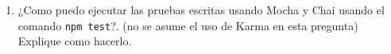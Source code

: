 \begin{Shaded}
\begin{Highlighting}[]
        \NormalTok{[~}\NormalTok{(karma)]$ cat tests/}
         \OtherTok{____}\NormalTok{;}

        \FunctionTok{_____}\NormalTok{(}\NormalTok{, }\NormalTok{() \{}

            \FunctionTok{____}\NormalTok{(}\NormalTok{, }\NormalTok{() \{}
                 \NormalTok{= }\NormalTok{;}
                \NormalTok{();}
                \FunctionTok{_________}\NormalTok{(}\NormalTok{, }\NormalTok{);}
            \NormalTok{\});}
        \NormalTok{\});}
\end{Highlighting}
\end{Shaded}

\begin{enumerate}
\def\labelenumi{\arabic{enumi}.}
\setcounter{enumi}{4}
\itemsep1pt\parskip0pt
\item
  ¿Como puedo ejecutar las pruebas escritas usando Mocha y Chai usando
  el comando \texttt{npm test}?. (no se asume el uso de Karma en esta
  pregunta) Explique como hacerlo.
\end{enumerate}

